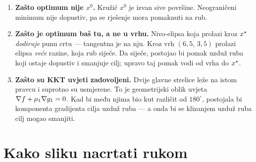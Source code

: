\begin{korak}
\begin{enumerate}[leftmargin=*]
  \item \textbf{Zašto optimum nije $x^{0}$.} Kružić $x^{0}$ je izvan sive
        površine. Neograničeni minimum nije dopustiv, pa se rješenje mora
        pomaknuti na rub.
  \item \textbf{Zašto je optimum baš tu, a ne u vrhu.} Nivo-elipsa koja prolazi
        kroz $x^{\star}$ \emph{dodiruje} punu crtu --- tangentna je na nju. Kroz vrh
        $(6{,}5,\, 3{,}5)$ prolazi elipsa \emph{veće} razine, koja rub siječe. Da
        siječe, postojao bi pomak uzduž ruba koji ostaje dopustiv i smanjuje
        cilj; upravo taj pomak vodi od vrha do $x^{\star}$.
  \item \textbf{Zašto su KKT uvjeti zadovoljeni.} Dvije glavne strelice leže na
        istom pravcu i suprotno su usmjerene. To je geometrijski oblik uvjeta
        $\nabla f + \mu_1 \nabla g_1 = 0$. Kad bi među njima bio kut različit od
        $180^\circ$, postojala bi komponenta gradijenta cilja uzduž ruba --- a
        onda bi se klizanjem uzduž ruba cilj mogao smanjiti.
\end{enumerate}
\end{korak}

\section{Kako sliku nacrtati rukom}
\label{sec:z1c-crtanje}

